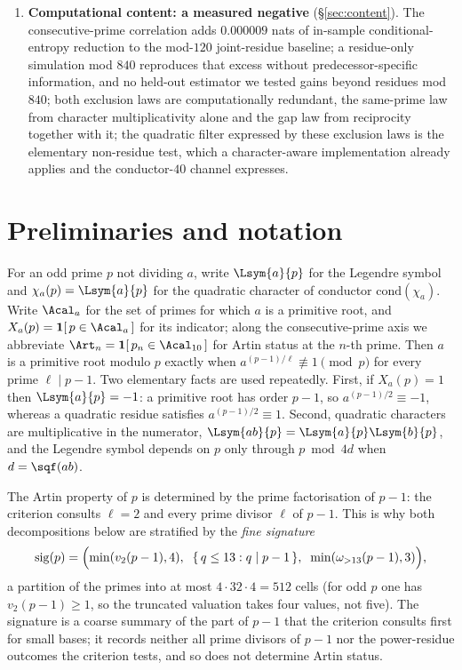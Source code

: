 \begin{enumerate}
	Matthews--Moree--Stevenhagen predictions match the measured joint densities to a mean
	relative error of $0.012\%$, with no fitted parameters.
	\item \textbf{Computational content: a measured negative} (\S\ref{sec:content}). The
	consecutive-prime correlation adds $0.000009$ nats of in-sample conditional-entropy
	reduction to the mod-$120$ joint-residue baseline; a residue-only simulation mod $840$
	reproduces that excess without predecessor-specific information, and no held-out estimator we tested gains
	beyond residues mod $840$; both exclusion laws are computationally
	redundant, the same-prime law from character multiplicativity alone and the gap law from
	reciprocity together with it;
	the quadratic filter expressed by these exclusion laws is the elementary non-residue test,
	which a character-aware implementation already applies and the conductor-$40$ channel expresses.
\end{enumerate}

\section{Preliminaries and notation}
\label{sec:prelim}

For an odd prime $p$ not dividing $a$, write $\Lsym{a}{p}$ for the Legendre symbol and
$\chi_a(p)=\Lsym{a}{p}$ for the quadratic character of conductor $\mathrm{cond}(\chi_a)$.
Write $\Acal_a$ for the set of primes for which $a$ is a primitive root, and
$X_a(p)=\mathbf{1}[\,p\in\Acal_a\,]$ for its indicator; along the consecutive-prime axis we
abbreviate $\Art_n = \mathbf{1}[\,p_n\in\Acal_{10}\,]$ for Artin status at the $n$-th prime.
Then $a$ is a primitive root modulo $p$ exactly when $a^{(p-1)/\ell}\not\equiv 1 \pmod p$ for every prime
$\ell \mid p-1$. Two elementary facts are used repeatedly. First, if $X_a(p)=1$ then
$\Lsym{a}{p}=-1$: a primitive root has order $p-1$, so $a^{(p-1)/2}\equiv -1$, whereas a
quadratic residue satisfies $a^{(p-1)/2}\equiv 1$. Second, quadratic characters are
multiplicative in the numerator, $\Lsym{ab}{p}=\Lsym{a}{p}\Lsym{b}{p}$, and the Legendre
symbol depends on $p$ only through $p \bmod 4d$ when $d=\sqf(ab)$.

The Artin property of $p$ is determined by the prime factorisation of $p-1$: the criterion
consults $\ell=2$ and every prime divisor $\ell$ of $p-1$. This is why both decompositions
below are stratified by the \emph{fine signature}
\[
	\mathrm{sig}(p) = \Bigl(\min(v_2(p-1),4),\;\; \{\,q\le 13 : q\mid p-1\,\},\;\;
	\min(\omega_{>13}(p-1),3)\Bigr),
\]
a partition of the primes into at most $4\cdot 32\cdot 4 = 512$ cells (for odd $p$ one has
$v_2(p-1)\ge 1$, so the truncated valuation takes four values, not five). The signature
is a coarse summary of the part of $p-1$ that the criterion consults first for small bases;
it records neither all prime divisors of $p-1$ nor the power-residue outcomes the criterion
tests, and so does not determine Artin status.
